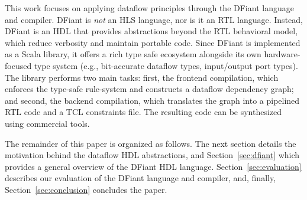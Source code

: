 This work focuses on applying dataflow principles through the DFiant language and compiler. DFiant is \emph{not} an HLS language, nor is it an RTL language. Instead, DFiant is an HDL that provides abstractions beyond the RTL behavioral model, which reduce verbosity and maintain portable code. Since DFiant is implemented as a Scala library, it offers a rich type safe ecosystem alongside its own hardware-focused type system (e.g., bit-accurate dataflow types, input/output port types). The library performs two main tasks: first, the frontend compilation, which enforces the type-safe rule-system and constructs a dataflow dependency graph; and second, the backend compilation, which translates the graph into a pipelined RTL code and a TCL constraints file. The resulting code can be synthesized using commercial tools. 

The remainder of this paper is organized as follows. The next section details the motivation behind the dataflow HDL abstractions, and Section~\ref{sec:dfiant} which provides a general overview of the DFiant HDL language. 
Section~\ref{sec:evaluation} describes our evaluation of the DFiant language and compiler, and, finally, Section~\ref{sec:conclusion} concludes the paper.


 